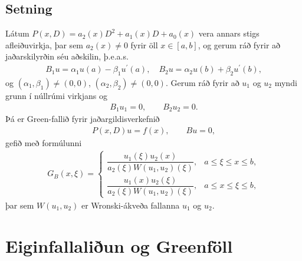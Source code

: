 \documentclass[a4paper,10pt,icelandic]{sphinxmanual}
\begin{document}
\subsection{Setning}
\label{\detokenize{Kafli03:id10}}
Látum \(P(x,D)=a_2(x)D^2+a_1(x)D+a_0(x)\) vera annars stigs
afleiðuvirkja, þar sem \(a_2(x)\neq 0\) fyrir öll
\(x\in [a,b]\), og gerum ráð fyrir að jaðarskilyrðin séu aðskilin, þ.e.a.s.
\begin{equation*}
\begin{split}B_1u=\alpha_1u(a)-\beta_1u{{^{\prime}}}(a), \quad
 B_2u=\alpha_2u(b)+\beta_2u{{^{\prime}}}(b),\end{split}
\end{equation*}
og \((\alpha_1,\beta_1)\neq(0,0)\), \((\alpha_2,\beta_2)\neq (0,0)\). Gerum ráð fyrir að \(u_1\) og \(u_2\) myndi grunn í
núllrúmi virkjans og
\begin{equation*}
\begin{split}B_1u_1=0, \qquad B_2u_2=0.\end{split}
\end{equation*}
Þá er Green-fallið fyrir jaðargildisverkefnið
\begin{equation*}
\begin{split}P(x,D)u=f(x), \qquad Bu=0,\end{split}
\end{equation*}
gefið með formúlunni
\begin{equation*}
\begin{split}G_B(x,{\xi}) = \begin{cases} \dfrac{u_1({\xi})u_2(x)}
 {a_2({\xi})W(u_1,u_2)({\xi})}, &a\leq {\xi}\leq x\leq b,\\
  \dfrac{u_1(x)u_2({\xi})}
 {a_2({\xi})W(u_1,u_2)({\xi})}, &a\leq x\leq {\xi}\leq b,
 \end{cases}\end{split}
\end{equation*}
þar sem \(W(u_1,u_2)\) er Wronski-ákveða fallanna \(u_1\) og
\(u_2\).


\section{Eiginfallaliðun og Green\textendash{}föll}
\label{\detokenize{Kafli03:eiginfallaliun-og-greenfoll}}
\end{document}
